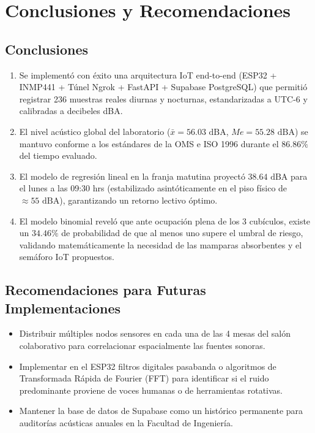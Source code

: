 \documentclass{article}
\begin{document}
\section{Conclusiones y Recomendaciones}

\subsection{Conclusiones}
\begin{enumerate}
    \item Se implementó con éxito una arquitectura IoT end-to-end (ESP32 + INMP441 + Túnel Ngrok + FastAPI + Supabase PostgreSQL) que permitió registrar 236 muestras reales diurnas y nocturnas, estandarizadas a UTC-6 y calibradas a decibeles dBA.
    \item El nivel acústico global del laboratorio ($\bar{x} = 56.03\text{ dBA}$, $Me = 55.28\text{ dBA}$) se mantuvo conforme a los estándares de la OMS e ISO 1996 durante el $86.86\%$ del tiempo evaluado.
    \item El modelo de regresión lineal en la franja matutina proyectó $38.64\text{ dBA}$ para el lunes a las 09:30 hrs (estabilizado asintóticamente en el piso físico de $\approx 55\text{ dBA}$), garantizando un retorno lectivo óptimo.
    \item El modelo binomial reveló que ante ocupación plena de los 3 cubículos, existe un $34.46\%$ de probabilidad de que al menos uno supere el umbral de riesgo, validando matemáticamente la necesidad de las mamparas absorbentes y el semáforo IoT propuestos.
\end{enumerate}

\subsection{Recomendaciones para Futuras Implementaciones}
\begin{itemize}
    \item Distribuir múltiples nodos sensores en cada una de las 4 mesas del salón colaborativo para correlacionar espacialmente las fuentes sonoras.
    \item Implementar en el ESP32 filtros digitales pasabanda o algoritmos de Transformada Rápida de Fourier (FFT) para identificar si el ruido predominante proviene de voces humanas o de herramientas rotativas.
    \item Mantener la base de datos de Supabase como un histórico permanente para auditorías acústicas anuales en la Facultad de Ingeniería.
\end{itemize}
\end{document}
